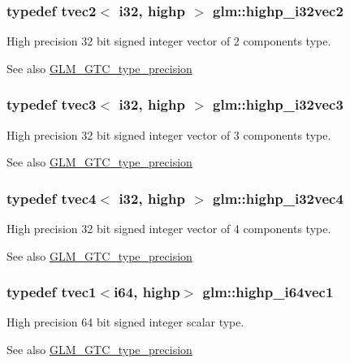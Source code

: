 \subsubsection[{highp\+\_\+i32vec2}]{\setlength{\rightskip}{0pt plus 5cm}typedef tvec2$<$ {\bf i32}, highp $>$ {\bf glm\+::highp\+\_\+i32vec2}}\label{namespaceglm_a88f1af6328724a83287eb1fbc3471171}
High precision 32 bit signed integer vector of 2 components type. \begin{DoxySeeAlso}{See also}
\hyperlink{group__gtc__type__precision}{G\+L\+M\+\_\+\+G\+T\+C\+\_\+type\+\_\+precision} 
\end{DoxySeeAlso}
\hypertarget{namespaceglm_a83507b7234f4d89f6dbe83ec46c68c42}{}
\subsubsection[{highp\+\_\+i32vec3}]{\setlength{\rightskip}{0pt plus 5cm}typedef tvec3$<$ {\bf i32}, highp $>$ {\bf glm\+::highp\+\_\+i32vec3}}\label{namespaceglm_a83507b7234f4d89f6dbe83ec46c68c42}
High precision 32 bit signed integer vector of 3 components type. \begin{DoxySeeAlso}{See also}
\hyperlink{group__gtc__type__precision}{G\+L\+M\+\_\+\+G\+T\+C\+\_\+type\+\_\+precision} 
\end{DoxySeeAlso}
\hypertarget{namespaceglm_a09a96f2ad6c9c3ace7bfdbabed5d859f}{}
\subsubsection[{highp\+\_\+i32vec4}]{\setlength{\rightskip}{0pt plus 5cm}typedef tvec4$<$ {\bf i32}, highp $>$ {\bf glm\+::highp\+\_\+i32vec4}}\label{namespaceglm_a09a96f2ad6c9c3ace7bfdbabed5d859f}
High precision 32 bit signed integer vector of 4 components type. \begin{DoxySeeAlso}{See also}
\hyperlink{group__gtc__type__precision}{G\+L\+M\+\_\+\+G\+T\+C\+\_\+type\+\_\+precision} 
\end{DoxySeeAlso}
\hypertarget{namespaceglm_a2fefd6da904e77486fc57d4596eee3f4}{}
\subsubsection[{highp\+\_\+i64vec1}]{\setlength{\rightskip}{0pt plus 5cm}typedef tvec1$<${\bf i64}, highp$>$ {\bf glm\+::highp\+\_\+i64vec1}}\label{namespaceglm_a2fefd6da904e77486fc57d4596eee3f4}
High precision 64 bit signed integer scalar type. \begin{DoxySeeAlso}{See also}
\hyperlink{group__gtc__type__precision}{G\+L\+M\+\_\+\+G\+T\+C\+\_\+type\+\_\+precision} 
\end{DoxySeeAlso}
\hypertarget{namespaceglm_a8b9347c378dc3f977fdd0c3ea995b7ad}{}
